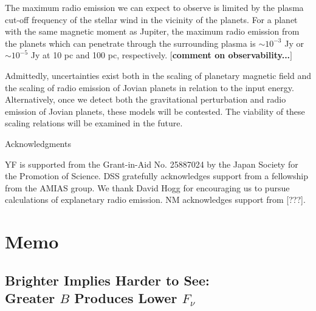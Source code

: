\documentclass{emulateapj}
\def\memoYF#1{\color{red}$[${\bf #1}$]$ \color{black}}
\begin{document}
The maximum radio emission we can expect to observe is limited by the plasma cut-off frequency of the stellar wind in the vicinity of the planets. 
For a planet with the same magnetic moment as Jupiter, the maximum radio emission from the planets which can penetrate through the surrounding plasma is $\sim 10^{-3}$ Jy or $\sim 10^{-5}$ Jy at 10 pc and 100 pc, respectively. 
\memoYF{comment on observability...}

Admittedly, uncertainties exist both in the scaling of planetary magnetic field  and the scaling of radio emission of Jovian planets in relation to the input energy. 
Alternatively, once we detect both the gravitational perturbation and radio emission of Jovian planets, these models will be contested. The viability of these scaling relations will be examined in the future. 


\vspace{0.5in}

\acknowledgements

{\sc Acknowledgments}

YF is supported from the Grant-in-Aid No. 25887024 by the Japan Society for the Promotion of Science.
DSS gratefully acknowledges support from a fellowship from the AMIAS group.
We thank David Hogg for encouraging us to pursue calculations of explanetary radio emission.
NM acknowledges support from [???].





\clearpage




\section{Memo}

\subsection{Brighter Implies Harder to See:\\
Greater $B$ Produces Lower $F_\nu$}
\label{ss:counterintuitive}
\end{document}
